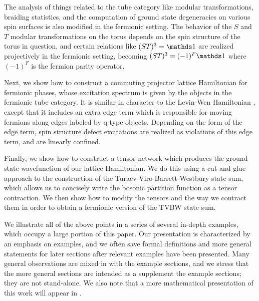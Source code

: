 The analysis of things related to the tube category like modular transformations, braiding statistics, and the computation of ground state degeneracies on various spin surfaces
is also modified in the fermionic setting.  
The behavior of the $S$ and $T$ modular transformations on the torus depends on the spin structure of the torus in question, and 
certain relations like $(ST)^3 = \unit$ are realized projectively in the fermionic setting, becoming 
$(ST)^3=(-1)^F\unit$ where $(-1)^F$ is the fermion parity operator.

Next, we show how to construct a commuting projector lattice Hamiltonian 
for fermionic phases, whose excitation spectrum is given by the objects in the fermionic tube category.  
It is similar in character to the Levin-Wen Hamiltonian \cite{levin2005}, 
except that it includes an extra edge term which is responsible for moving fermions along
edges labeled by q-type objects. 
Depending on the form of the edge term, spin structure defect excitations 
are realized as violations of this edge term, and are linearly confined. 

Finally, we show how to construct a tensor network which produces the ground state 
wavefunction of our lattice Hamiltonian. We do this using a cut-and-glue approach to 
the construction of the Turaev-Viro-Barrett-Westbury state sum, which allows us to concisely write the bosonic partition function
as a tensor contraction. We then show how to modify the tensors 
and the way we contract them in order to obtain a fermionic version of the TVBW state sum.  

We illustrate all of the above points in a series of several in-depth examples, which occupy a large portion 
of this paper.
Our presentation is characterized by an emphasis on examples, 
and we often save formal definitions and more general statements 
for later sections after relevant examples have been presented.  
Many general observations are mixed in with the example sections,
and we stress that the more general sections are intended as a supplement
the example sections; they are not stand-alone.
We also note that a more mathematical presentation of this work will appear in \cite{Kevin and scott's paper?}. 


